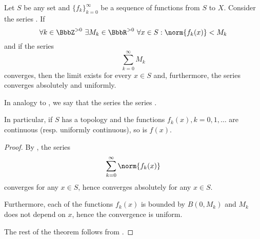 \begin{corollary}\label{thm:weierstrass_series_criterion}\mcite\cite[]{Фихтенгольц1968/2}
  Let \( S \) be any set and \( \{ f_k \}_{k=0}^\infty \) be a sequence of functions from \( S \) to \( X \). Consider the series . If
  \begin{equation*}
    \forall k \in \BbbZ^{>0} \ \exists M_k \in \BbbR^{>0} \ \forall x \in S : \norm{f_k(x)} < M_k
  \end{equation*}
  and if the series
  \begin{equation}\label{thm:weierstrass_series_criterion/dominating}
    \sum_{k=0}^\infty M_k
  \end{equation}
  converges, then the limit  exists for every \( x \in S \) and, furthermore, the series converges absolutely and uniformly.

  In analogy to , we say that the series   the series .

  In particular, if \( S \) has a topology and the functions \( f_k(x), k = 0, 1, \ldots \) are continuous (resp. uniformly continuous), so is \( f(x) \).
\end{corollary}
\begin{proof}
  By , the series
  \begin{equation*}
    \sum_{k=0}^\infty \norm{f_k(x)}
  \end{equation*}
  converges for any \( x \in S \), hence  converges absolutely for any \( x \in S \).

  Furthermore, each of the functions \( f_k(x) \) is bounded by \( B(0, M_k) \) and \( M_k \) does not depend on \( x \), hence the convergence is uniform.

  The rest of the theorem follows from .
\end{proof}

